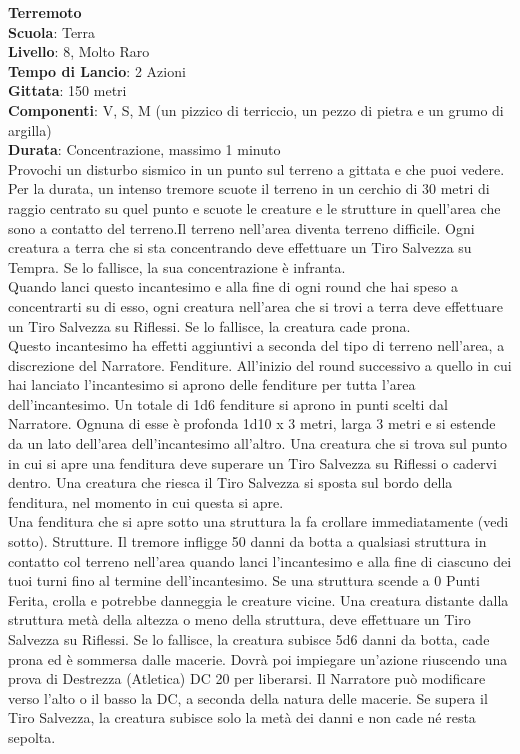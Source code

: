 \begin{multicols}{2}
\medskip\textbf{Terremoto}\\
\textbf{Scuola}: Terra\\
\textbf{Livello}: 8, Molto Raro\\
\textbf{Tempo di Lancio}: 2 Azioni\\
\textbf{Gittata}: 150 metri\\
\textbf{Componenti}: V, S, M (un pizzico di terriccio, un pezzo di pietra e un grumo di argilla)\\
\textbf{Durata}: Concentrazione, massimo 1 minuto\\
Provochi un disturbo sismico in un punto sul terreno a gittata e che puoi vedere. Per la durata, un intenso tremore scuote il terreno in un cerchio di 30 metri di raggio centrato su quel punto e scuote le creature e le strutture in quell'area che sono a contatto del terreno.Il terreno nell'area diventa terreno difficile. Ogni creatura a terra che si sta concentrando deve effettuare un Tiro Salvezza su Tempra. Se lo fallisce, la sua concentrazione è infranta.\\
Quando lanci questo incantesimo e alla fine di ogni round che hai speso a concentrarti su di esso, ogni creatura nell'area che si trovi a terra deve effettuare un Tiro Salvezza su Riflessi. Se lo fallisce, la creatura cade prona.\\
Questo incantesimo ha effetti aggiuntivi a seconda del tipo di terreno nell'area, a discrezione del Narratore. Fenditure. All'inizio del round successivo a quello in cui hai lanciato l'incantesimo si aprono delle fenditure per tutta l'area dell'incantesimo. Un totale di 1d6 fenditure si aprono in punti scelti dal Narratore. Ognuna di esse è profonda 1d10 x 3 metri, larga 3 metri e si estende da un lato dell'area dell'incantesimo all'altro. Una creatura che si trova sul punto in cui si apre una fenditura deve superare un Tiro Salvezza su Riflessi o cadervi dentro. Una creatura che riesca il Tiro Salvezza si sposta sul bordo della fenditura, nel momento in cui questa si apre.\\
Una fenditura che si apre sotto una struttura la fa crollare immediatamente (vedi sotto). Strutture. Il tremore infligge 50 danni da botta a qualsiasi struttura in contatto col terreno nell'area quando lanci l'incantesimo e alla fine di ciascuno dei tuoi turni fino al termine dell'incantesimo. Se una struttura scende a 0 Punti Ferita, crolla e potrebbe danneggia le creature vicine. Una creatura distante dalla struttura metà della altezza o meno della struttura, deve effettuare un Tiro Salvezza su Riflessi. Se lo fallisce, la creatura subisce 5d6 danni da botta, cade prona ed è sommersa dalle macerie. Dovrà poi impiegare un'azione riuscendo una prova di Destrezza (Atletica) DC 20 per liberarsi. Il Narratore può modificare verso l'alto o il basso la DC, a seconda della natura delle macerie. Se supera il Tiro Salvezza, la creatura subisce solo la metà dei danni e non cade né resta sepolta.


\end{multicols}
